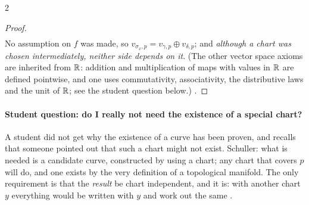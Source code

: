\begin{paracol}{2}
\begin{proof}
\[\begin{aligned}
\end{aligned}\]
No assumption on $f$ was made, so $v_{\sigma_x,p}=v_{\gamma,p}\oplus v_{\delta,p}$; and \emph{although a chart was chosen intermediately, neither side depends on it}. (The other vector space axioms are inherited from $\mathbb{R}$: addition and multiplication of maps with values in $\mathbb{R}$ are defined pointwise, and one uses
commutativity, associativity, the distributive laws and the unit of $\mathbb{R}$; see the student question below.)
.
\end{proof}

\paragraph{Student question: do I really not need the existence of a special chart?} A student did not get why the existence of a curve has been proven, and recalls that someone pointed out that such a chart might not exist. Schuller: what is needed is a candidate curve, constructed by using a chart; any chart that covers $p$ will do, and one exists by the very definition of a topological manifold.
The only requirement is that the \emph{result} be chart independent, and it is: with another chart $y$ everything would be written with $y$ and work out the same .


\end{paracol}
